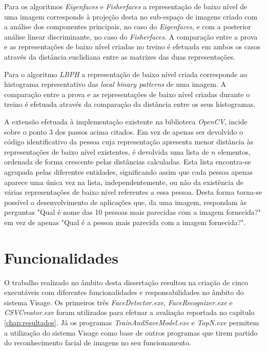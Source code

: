 Para os algoritmos \textit{Eigenfaces} e \textit{Fisherfaces} a representação de baixo nível de uma imagem corresponde à projeção desta no sub-espaço de imagens criado com a análise dos componentes principais, no caso do \textit{Eigenfaces}, e com a posterior análise linear discriminante, no caso do \textit{Fisherfaces}. A comparação entre a prova e as representações de baixo nível criadas no treino é efetuada em ambos os casos através da distância euclidiana entre as matrizes das duas representações.

Para o algoritmo \textit{LBPH} a representação de baixo nível criada corresponde ao histograma representativo das \textit{local binary patterns} de uma imagem. A comparação entre a prova e as representações de baixo nível criadas durante o treino é efetuada através da comparação da distância entre os seus histogramas.

A extensão efetuada à implementação existente na biblioteca \textit{OpenCV}, incide sobre o ponto 3 dos passos acima citados. Em vez de apenas ser devolvido o código identificativo da pessoa cuja representação apresenta menor distância às representações de baixo nível existentes, é devolvida uma lista de $n$ elementos, ordenada de forma crescente pelas distâncias calculadas. Esta lista encontra-se agrupada pelas diferentes entidades, significando assim que cada pessoa apenas aparece uma única vez na lista, independentemente, ou não da existência de várias representações de baixo nível referentes a essa pessoa. Desta forma torna-se possível o desenvolvimento de aplicações que, da uma imagem, respondam às perguntas "Qual é nome das 10 pessoas mais parecidas com a imagem fornecida?" em vez de apenas "Qual é a pessoa mais parecida com a imagem fornecida?".

\section{Funcionalidades}
O trabalho realizado no âmbito desta dissertação resultou na criação de cinco executáveis com diferentes funcionalidades e responsabilidades no âmbito do sistema Visage. Os primeiros três \textit{FaceDetector.exe}, \textit{FaceRecognizer.exe} e \textit{CSVCreator.exe} foram utilizados para efetuar a avaliação reportada no capítulo \ref{chap:resultados}. Já os programas \textit{TrainAndSaveModel.exe} e \textit{TopN.exe} permitem a utilização do sistema Visage como base de outros programas que tirem partido do reconhecimento facial de imagens no seu funcionamento.

